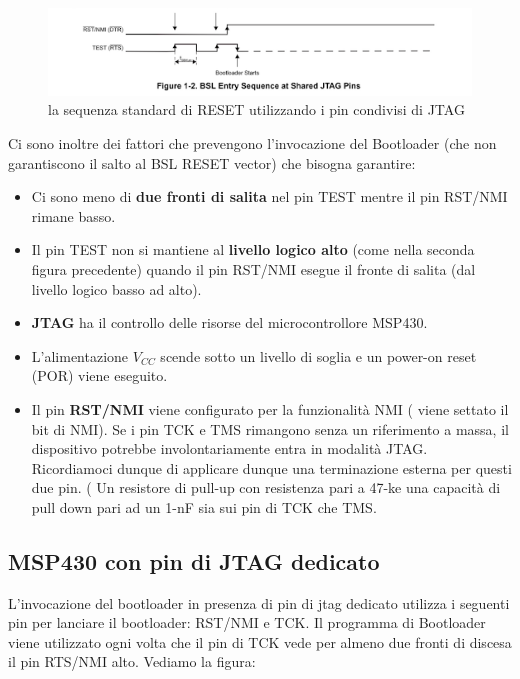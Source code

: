 \documentclass[LaM,binding=0.6cm,oneside]{../sapthesis}
\begin{document}
\begin{figure}[htbp]
\centerline{\includegraphics[scale=1.15]{examples/BSLEntrySequence.png}}
\caption{la sequenza standard di RESET utilizzando i pin condivisi di JTAG}
\label{fig}
\end{figure}


Ci sono inoltre dei fattori che prevengono l’invocazione del Bootloader (che non garantiscono il salto al BSL RESET vector) che bisogna garantire:
\begin{itemize}
\item Ci sono meno di \textbf{due fronti di salita} nel pin TEST mentre il pin RST/NMI rimane basso.
\item Il pin TEST non si mantiene al \textbf{livello logico alto} (come nella seconda figura precedente) quando il pin RST/NMI esegue il fronte di salita (dal livello logico basso ad alto).
\item \textbf{JTAG} ha il controllo delle risorse del microcontrollore MSP430.
\item L’alimentazione \textbf{$V_{CC}$} scende sotto un livello di soglia e un power-on reset (POR) viene eseguito.
\item Il pin \textbf{RST/NMI} viene configurato per la funzionalità NMI ( viene settato il bit di NMI).
 Se i pin TCK e TMS rimangono senza un riferimento a massa, il dispositivo potrebbe involontariamente entra in modalità JTAG. Ricordiamoci dunque di applicare dunque una terminazione esterna per questi due pin. ( Un resistore di pull-up con
resistenza pari a 47-k\ohm e una capacità di pull down pari ad un 1-nF sia sui pin di TCK che TMS.
\end{itemize}

\subsection{MSP430 con pin di JTAG dedicato}

L’invocazione del bootloader in presenza di pin di jtag dedicato utilizza i seguenti pin per lanciare il bootloader: RST/NMI e TCK.
Il programma di Bootloader viene utilizzato ogni volta che il pin di TCK vede per almeno due fronti di discesa il pin RTS/NMI alto.
Vediamo la figura:
\end{document}
